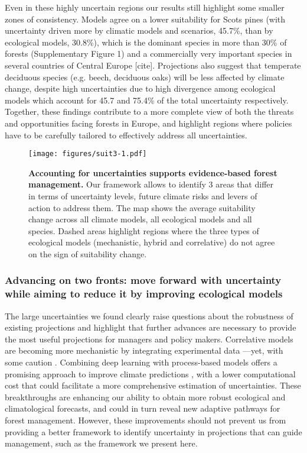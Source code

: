 \documentclass[11pt,letter]{article}
\begin{document}
Even in these highly uncertain regions our results still highlight some smaller zones of consistency. Models agree on a lower suitability for Scots pines (with uncertainty driven more by climatic models and scenarios, 45.7\%, than by ecological models, 30.8\%), which is the dominant species in more than 30\% of forests (Supplementary Figure 1) and a commercially very important species in several countries of Central Europe [cite]. %
Projections also suggest that temperate deciduous species (e.g. beech, deciduous oaks) will be less affected by climate change, despite high uncertainties due to high divergence among ecological models which account for 45.7 and 75.4\% of the total uncertainty respectively. Together, these findings contribute to a more complete view of both the threats and opportunities facing forests in Europe, and highlight regions where policies have to be carefully tailored to effectively address all uncertainties.



\begin{figure}
	\centering
	\texttt{[image: figures/suit3-1.pdf]}
	\caption{\textbf{Accounting for uncertainties supports evidence-based forest management.} Our framework allows to identify 3 areas that differ in terms of uncertainty levels, future climate risks and levers of action to address them. The map shows the average suitability change across all climate models, all ecological models and all species. Dashed areas highlight regions where the three types of ecological models (mechanistic, hybrid and correlative) do not agree on the sign of suitability change.}
	\label{fig:manag}
\end{figure}

\subsubsection*{Advancing on two fronts: move forward with uncertainty while aiming to reduce it by improving ecological models}

The large uncertainties we found clearly raise questions about the robustness of existing projections and highlight that further advances are necessary to provide the most useful projections for managers and policy makers. 
Correlative models are becoming more mechanistic by integrating experimental data \citep{Wagner2023}---yet, with some caution \citep{Chevalier2024a}. Combining deep learning with process-based models offers a promising approach to improve climate predictions \citep{Kochkov2024}, with a lower computational cost that could facilitate a more comprehensive estimation of uncertainties. These breakthroughs are enhancing our ability to obtain more robust ecological and climatological forecasts, and could in turn reveal new adaptive pathways for forest management. However, these improvements should not prevent us from providing a better framework to identify uncertainty in projections that can guide management, such as the framework we present here.  
\end{document}
